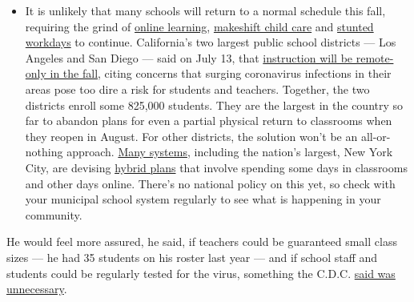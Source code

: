 \begin{itemize}
  \begin{itemize}
  \tightlist
  \item
    It is unlikely that many schools will return to a normal schedule
    this fall, requiring the grind of
    \href{https://www.nytimes3xbfgragh.onion/2020/06/05/us/coronavirus-education-lost-learning.html?action=click\&pgtype=Article\&state=default\&region=MAIN_CONTENT_3\&context=storylines_faq}{online
    learning},
    \href{https://www.nytimes3xbfgragh.onion/2020/05/29/us/coronavirus-child-care-centers.html?action=click\&pgtype=Article\&state=default\&region=MAIN_CONTENT_3\&context=storylines_faq}{makeshift
    child care} and
    \href{https://www.nytimes3xbfgragh.onion/2020/06/03/business/economy/coronavirus-working-women.html?action=click\&pgtype=Article\&state=default\&region=MAIN_CONTENT_3\&context=storylines_faq}{stunted
    workdays} to continue. California's two largest public school
    districts --- Los Angeles and San Diego --- said on July 13, that
    \href{https://www.nytimes3xbfgragh.onion/2020/07/13/us/lausd-san-diego-school-reopening.html?action=click\&pgtype=Article\&state=default\&region=MAIN_CONTENT_3\&context=storylines_faq}{instruction
    will be remote-only in the fall}, citing concerns that surging
    coronavirus infections in their areas pose too dire a risk for
    students and teachers. Together, the two districts enroll some
    825,000 students. They are the largest in the country so far to
    abandon plans for even a partial physical return to classrooms when
    they reopen in August. For other districts, the solution won't be an
    all-or-nothing approach.
    \href{https://bioethics.jhu.edu/research-and-outreach/projects/eschool-initiative/school-policy-tracker/}{Many
    systems}, including the nation's largest, New York City, are
    devising
    \href{https://www.nytimes3xbfgragh.onion/2020/06/26/us/coronavirus-schools-reopen-fall.html?action=click\&pgtype=Article\&state=default\&region=MAIN_CONTENT_3\&context=storylines_faq}{hybrid
    plans} that involve spending some days in classrooms and other days
    online. There's no national policy on this yet, so check with your
    municipal school system regularly to see what is happening in your
    community.
  \end{itemize}
\end{itemize}

He would feel more assured, he said, if teachers could be guaranteed
small class sizes --- he had 35 students on his roster last year --- and
if school staff and students could be regularly tested for the virus,
something the C.D.C.
\href{https://www.cdc.gov/coronavirus/2019-ncov/community/schools-childcare/k-12-testing.html}{said
was unnecessary}.

